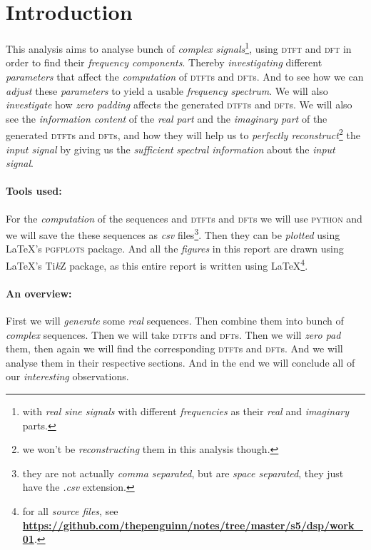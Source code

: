 \documentclass[../../course]{subfiles}
\begin{document}
\section{Introduction} \label{sec:wrkFrequencyAnalysisIntro}

This analysis aims to analyse bunch of \emph{complex signals}\footnote{with
\emph{real sine signals} with different \emph{frequencies} as their \emph{real}
and \emph{imaginary} parts.}, using \textsc{dtft} and \textsc{dft} in order to find
their \emph{frequency components}. Thereby \emph{investigating} different \emph{parameters}
that affect the \emph{computation} of \textsc{dtft}s and \textsc{dft}s.
And to see how we can \emph{adjust} these \emph{parameters} to yield a usable
\emph{frequency spectrum}. We will also \emph{investigate} how \emph{zero padding}
affects the generated \textsc{dtft}s and \textsc{dft}s. We will also see the
\emph{information content} of the \emph{real part} and the \emph{imaginary part}
of the generated \textsc{dtft}s and \textsc{dft}s, and how they will
help us to \emph{perfectly reconstruct}\footnote{we won't be \emph{reconstructing}
them in this analysis though.} the \emph{input signal} by giving us the
\emph{sufficient} \emph{spectral information} about the \emph{input signal}.

\paragraph{Tools used:} For the \emph{computation} of the sequences and \textsc{dtft}s
and \textsc{dft}s we will use \textsc{python} and we will save the these sequences as
\emph{csv} files\footnote{they are not actually \emph{comma separated}, but are
\emph{space separated}, they just have the
\emph{.csv} extension.}. Then they can be \emph{plotted} using \LaTeX's \textsc{pgfplots}
package. And all the \emph{figures} in this report are drawn using \LaTeX's Ti\emph{k}Z package,
as this entire report is written using \LaTeX\footnote{for all \emph{source files},
see \textbf{ \href{https://github.com/thepenguinn/notes/tree/master/s5/dsp/work_01}
{https://github.com/thepenguinn/notes/tree/master/s5/dsp/work\_01}}.}.

\paragraph{An overview:} First we will \emph{generate} some \emph{real}
sequences. Then combine them into bunch of \emph{complex} sequences. Then we will take
\textsc{dtft}s and \textsc{dft}s. Then we will \emph{zero pad} them, then again we will find the
corresponding \textsc{dtft}s and \textsc{dft}s. And we will analyse them in their
respective sections. And in the end we will conclude all of our \emph{interesting}
observations.
\end{document}
